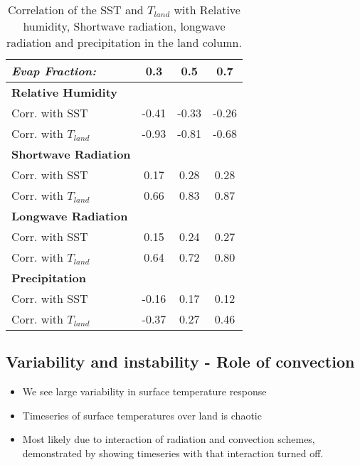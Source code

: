 \begin{center}
	\begin{table}[ht]
		\caption{Correlation of the SST and $T_{land}$ with Relative humidity, 
		Shortwave radiation, longwave radiation and precipitation in the land 
	column.}
		\label{tab:scm_SSTVar}
		\scriptsize
	\begin{tabular}{ l  c  c  c }
		\textit{Evap Fraction:}		& 0.3   & 0.5  & 0.7 \\ \hline
		\textbf{Relative Humidity}\\%
	Corr. with SST						& -0.41  & -0.33 & -0.26\\ %
		Corr. with $T_{land}$			& -0.93  & -0.81 & -0.68\\ 
		\textbf{Shortwave Radiation}\\%
	Corr. with SST						& 0.17  & 0.28 & 0.28\\ %
		Corr. with $T_{land}$			& 0.66  & 0.83 & 0.87\\ 
		\textbf{Longwave Radiation}\\%
	Corr. with SST						& 0.15  & 0.24 & 0.27\\ %
		Corr. with $T_{land}$			& 0.64  & 0.72 & 0.80\\ 
		\textbf{Precipitation}\\%
	Corr. with SST						& -0.16  & 0.17 & 0.12\\ %
		Corr. with $T_{land}$			& -0.37  & 0.27 & 0.46\\ 
	\end{tabular}
	\end{table}
\end{center}

\clearpage


\subsection{Variability and instability - Role of convection}
\label{instability}

\begin{itemize}
	\item We see large variability in surface temperature response
	\item Timeseries of surface temperatures over land is chaotic
	\item Most likely due to interaction of radiation and convection schemes, 
		demonstrated by showing timeseries with that interaction turned off.
\end{itemize}

